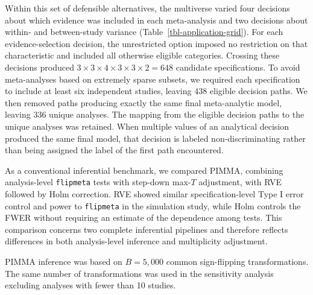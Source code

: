 \documentclass[
  man,
  longtable,
  nolmodern,
  notxfonts,
  notimes,
  colorlinks=true,linkcolor=blue,citecolor=blue,urlcolor=blue]{apa7}
\begin{document}
Within this set of defensible alternatives, the multiverse varied four
decisions about which evidence was included in each meta-analysis and
two decisions about within- and between-study variance
(Table~\ref{tbl-application-grid}). For each evidence-selection
decision, the unrestricted option imposed no restriction on that
characteristic and included all otherwise eligible categories. Crossing
these decisions produced
\(3 \times 3 \times 4 \times 3 \times 3 \times 2 = 648\) candidate
specifications. To avoid meta-analyses based on extremely sparse
subsets, we required each specification to include at least six
independent studies, leaving 438 eligible decision paths. We then
removed paths producing exactly the same final meta-analytic model,
leaving 336 unique analyses. The mapping from the eligible decision
paths to the unique analyses was retained. When multiple values of an
analytical decision produced the same final model, that decision is
labeled non-discriminating rather than being assigned the label of the
first path encountered.

As a conventional inferential benchmark, we compared PIMMA, combining
analysis-level \texttt{flipmeta} tests with step-down max-\(T\)
adjustment, with RVE followed by Holm correction. RVE showed similar
specification-level Type I error control and power to \texttt{flipmeta}
in the simulation study, while Holm controls the FWER without requiring
an estimate of the dependence among tests. This comparison concerns two
complete inferential pipelines and therefore reflects differences in
both analysis-level inference and multiplicity adjustment.

PIMMA inference was based on \(B = 5,000\) common sign-flipping
transformations. The same number of transformations was used in the
sensitivity analysis excluding analyses with fewer than 10 studies.
\end{document}
